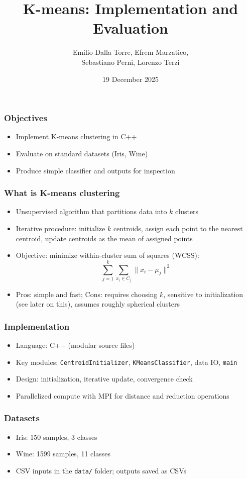 \documentclass{beamer}
\title{K-means: Implementation and Evaluation}
\author{Emilio Dalla Torre, Efrem Marzatico,\\Sebastiano Perni, Lorenzo Terzi}
\institute{Hands-on K-means}
\date{19 December 2025}
\begin{document}
\frame{\titlepage}


\begin{frame}\frametitle{Objectives}
    \begin{itemize}
        \item Implement K-means clustering in C++
        \item Evaluate on standard datasets (Iris, Wine)
        \item Produce simple classifier and outputs for inspection
    \end{itemize}
\end{frame}

\begin{frame}\frametitle{What is K-means clustering}
    \begin{itemize}
        \item Unsupervised algorithm that partitions data into $k$ clusters
        \item Iterative procedure: initialize $k$ centroids, assign each point to the nearest centroid, update centroids as the mean of assigned points
        \item Objective: minimize within-cluster sum of squares (WCSS):
              $$\sum_{j=1}^k \sum_{x_i \in C_j} \lVert x_i - \mu_j \rVert^2$$
        \item Pros: simple and fast; Cons: requires choosing $k$, sensitive to initialization (see later on this), assumes roughly spherical clusters
    \end{itemize}
\end{frame}

\begin{frame}\frametitle{Implementation}
    \begin{itemize}
        \item Language: C++ (modular source files)
        \item Key modules: \texttt{CentroidInitializer}, \texttt{KMeansClassifier}, data IO, \texttt{main}
        \item Design: initialization, iterative update, convergence check
        \item Parallelized compute with MPI for distance and reduction operations
    \end{itemize}
\end{frame}

\begin{frame}\frametitle{Datasets}
    \begin{itemize}
        \item Iris: 150 samples, 3 classes
        \item Wine: 1599 samples, 11 classes
        \item CSV inputs in the \texttt{data/} folder; outputs saved as CSVs
    \end{itemize}
\end{frame}
\end{document}
